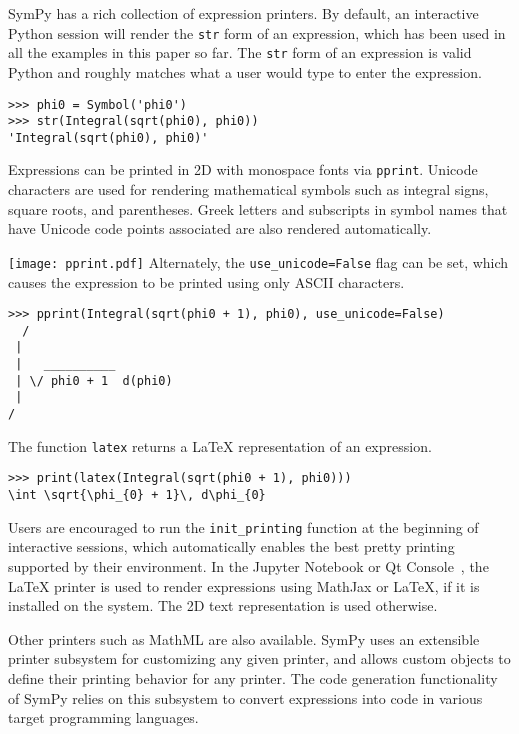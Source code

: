 SymPy has a rich collection of expression printers.
By default, an interactive Python session will render the
\verb|str| form of an expression, which has been used in all the examples in
this paper so far. The \verb|str| form of an expression is valid Python and
roughly matches what a user would type to enter the expression.

\begin{verbatim}
>>> phi0 = Symbol('phi0')
>>> str(Integral(sqrt(phi0), phi0))
'Integral(sqrt(phi0), phi0)'
\end{verbatim}

Expressions can be printed in 2D with monospace fonts via \verb|pprint|.
Unicode characters are used for rendering mathematical symbols such as integral signs,
square roots, and parentheses. Greek letters and subscripts in symbol names
that have Unicode code points associated
are also rendered automatically.

\noindent
\texttt{[image: pprint.pdf]}
Alternately, the \verb|use_unicode=False| flag can be set, which causes the
expression to be printed using only ASCII characters.

\begin{verbatim}
>>> pprint(Integral(sqrt(phi0 + 1), phi0), use_unicode=False)
  /
 |
 |   __________
 | \/ phi0 + 1  d(phi0)
 |
/
\end{verbatim}

The function \verb|latex| returns a \LaTeX{} representation of an expression.

\begin{verbatim}
>>> print(latex(Integral(sqrt(phi0 + 1), phi0)))
\int \sqrt{\phi_{0} + 1}\, d\phi_{0}
\end{verbatim}

Users are encouraged to run the \verb|init_printing| function at the beginning
of interactive sessions, which automatically enables the best pretty printing
supported by their environment. In the Jupyter Notebook or Qt
Console~\cite{perez2007ipython}, the \LaTeX{} printer is used to render
expressions using MathJax or \LaTeX{}, if it is installed on the system. The
2D text representation is used otherwise.

Other printers such as MathML are also available. SymPy uses an extensible
printer subsystem for customizing any given
printer, and allows custom objects to define their printing behavior for any
printer. The code generation functionality of SymPy
relies on this subsystem to convert expressions into code in various target
programming languages.
